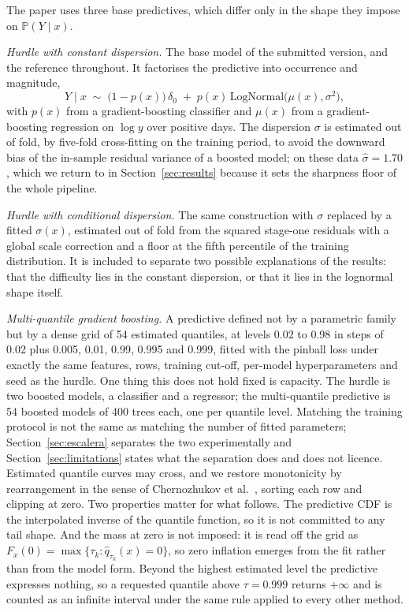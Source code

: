 \documentclass[preprint,3p,times]{elsarticle}
\begin{document}
The paper uses three base predictives, which differ only in the shape they impose on $\mathbb{P}(Y\mid x)$.

\emph{Hurdle with constant dispersion.} The base model of the submitted version, and the reference throughout. It factorises the predictive into occurrence and magnitude,
\begin{equation}
Y \mid x \;\sim\; \big(1-p(x)\big)\,\delta_0 \;+\; p(x)\,\mathrm{LogNormal}\big(\mu(x),\sigma^2\big),
\label{eq:hurdle}
\end{equation}
with $p(x)$ from a gradient-boosting classifier and $\mu(x)$ from a gradient-boosting regression on $\log y$ over positive days. The dispersion $\sigma$ is estimated out of fold, by five-fold cross-fitting on the training period, to avoid the downward bias of the in-sample residual variance of a boosted model; on these data $\hat\sigma=1.70$, which we return to in Section~\ref{sec:results} because it sets the sharpness floor of the whole pipeline.

\emph{Hurdle with conditional dispersion.} The same construction with $\sigma$ replaced by a fitted $\sigma(x)$, estimated out of fold from the squared stage-one residuals with a global scale correction and a floor at the fifth percentile of the training distribution. It is included to separate two possible explanations of the results: that the difficulty lies in the constant dispersion, or that it lies in the lognormal shape itself.

\emph{Multi-quantile gradient boosting.} A predictive defined not by a parametric family but by a dense grid of 54 estimated quantiles, at levels 0.02 to 0.98 in steps of 0.02 plus 0.005, 0.01, 0.99, 0.995 and 0.999, fitted with the pinball loss under exactly the same features, rows, training cut-off, per-model hyperparameters and seed as the hurdle. One thing this does not hold fixed is capacity. The hurdle is two boosted models, a classifier and a regressor; the multi-quantile predictive is 54 boosted models of 400 trees each, one per quantile level. Matching the training protocol is not the same as matching the number of fitted parameters; Section~\ref{sec:escalera} separates the two experimentally and Section~\ref{sec:limitations} states what the separation does and does not licence. Estimated quantile curves may cross, and we restore monotonicity by rearrangement in the sense of Chernozhukov et al.~\cite{chernozhukov2010}, sorting each row and clipping at zero. Two properties matter for what follows. The predictive CDF is the interpolated inverse of the quantile function, so it is not committed to any tail shape. And the mass at zero is not imposed: it is read off the grid as $F_x(0)=\max\{\tau_k:\hat q_{\tau_k}(x)=0\}$, so zero inflation emerges from the fit rather than from the model form. Beyond the highest estimated level the predictive expresses nothing, so a requested quantile above $\tau=0.999$ returns $+\infty$ and is counted as an infinite interval under the same rule applied to every other method.
\end{document}
